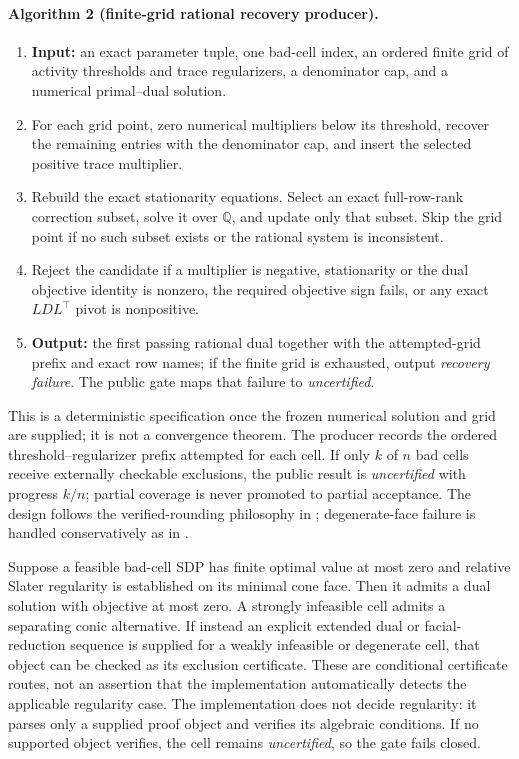 \documentclass[smallextended]{svjour3}
\begin{document}
\paragraph{Algorithm 2 (finite-grid rational recovery producer).}
\begin{enumerate}
  \item \textbf{Input:} an exact parameter tuple, one bad-cell index, an
  ordered finite grid of activity thresholds and trace regularizers, a
  denominator cap, and a numerical primal--dual solution.
  \item For each grid point, zero numerical multipliers below its threshold,
  recover the remaining entries with the denominator cap, and insert the
  selected positive trace multiplier.
  \item Rebuild the exact stationarity equations.  Select an exact
  full-row-rank correction subset, solve it over $\mathbb Q$, and update only
  that subset.  Skip the grid point if no such subset exists or the rational
  system is inconsistent.
  \item Reject the candidate if a multiplier is negative, stationarity or the
  dual objective identity is nonzero, the required objective sign fails, or
  any exact $LDL^\top$ pivot is nonpositive.
  \item \textbf{Output:} the first passing rational dual together with the
  attempted-grid prefix and exact row names; if the finite grid is exhausted,
  output \emph{recovery failure}.  The public gate maps that failure to
  \emph{uncertified}.
\end{enumerate}
This is a deterministic specification once the frozen numerical solution and
grid are supplied; it is not a convergence theorem.  The producer records the
ordered threshold--regularizer prefix attempted for each cell.  If only $k$ of
$n$ bad cells receive externally checkable exclusions, the public result
is \emph{uncertified} with progress $k/n$; partial coverage is never promoted
to partial acceptance.  The design follows the verified-rounding philosophy
in \citep{PeyrlParrilo2008,KaltofenLiYangZhi2008}; degenerate-face failure is
handled conservatively as in \citep{MonniauxCorbineau2011}.

\begin{proposition}
\label{prop:dual-routes}
Suppose a feasible bad-cell SDP has finite optimal value at most zero and relative
Slater regularity is established on its minimal cone face.  Then it admits a
dual solution with objective at most zero.  A strongly infeasible cell admits a separating conic
alternative.  If instead an explicit extended dual or facial-reduction
sequence is supplied for a weakly infeasible or degenerate cell, that object
can be checked as its exclusion certificate.  These are conditional
certificate routes, not an assertion that the implementation automatically
detects the applicable regularity case.  The implementation does not decide
regularity: it parses only a supplied proof object and verifies its algebraic
conditions.  If no supported object verifies, the cell remains
\emph{uncertified}, so the gate fails closed.
\end{proposition}
\end{document}
